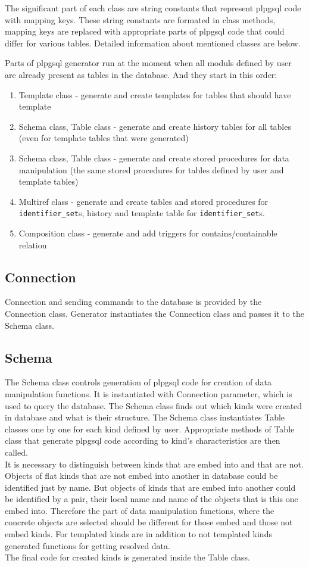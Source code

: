 \documentclass[deska]{subfiles}
\begin{document}
The significant part of each class are string constants that represent plpgsql code with mapping keys. These string constants are formated in class methods, mapping keys are replaced with appropriate parts of plpgsql code that could differ for various tables.
Detailed information about mentioned classes are below.

Parts of plpgsql generator run at the moment when all moduls defined by user are already present as tables in the database. And they start in this order:

\begin{enumerate}
    \item Template class - generate and create templates for tables that should have template
    \item Schema class, Table class - generate and create history tables for all tables (even for template tables that were generated)
    \item Schema class, Table class - generate and create stored procedures for data manipulation (the same stored procedures for tables defined by user and template tables)
    \item Multiref class - generate and create tables and stored procedures for {\tt identifier\_set}s, history and template table for {\tt identifier\_set}s.
    \item Composition class - generate and add triggers for contains/containable relation
\end{enumerate}

\subsection{Connection}
Connection and sending commands to the database is provided by the Connection class. Generator instantiates the Connection class and passes it to the Schema class.

\subsection{Schema}
The Schema class controls generation of plpgsql code for creation of data manipulation functions. It is instantiated with Connection parameter, which is used to query the database. 
The Schema class finds out which kinds were created in database and what is their structure. The Schema class instantiates Table classes one by one for each kind defined by user. Appropriate methods of Table class that generate plpgsql code according to kind's characteristics are then called.\\ It is necessary to distinguish between kinds that are embed into and that are not. Objects of flat kinds that are not embed into another in database could be identified just by name. But objects of kinds that are embed into another could be identified by a pair, their local name and name of the objects that is this one embed into. Therefore the part of data manipulation functions, where the concrete objects are selected should be different for those embed and those not embed kinds.
For templated kinds are in addition to not templated kinds generated functions for getting resolved data.\\
The final code for created kinds is generated inside the Table class.
\end{document}

